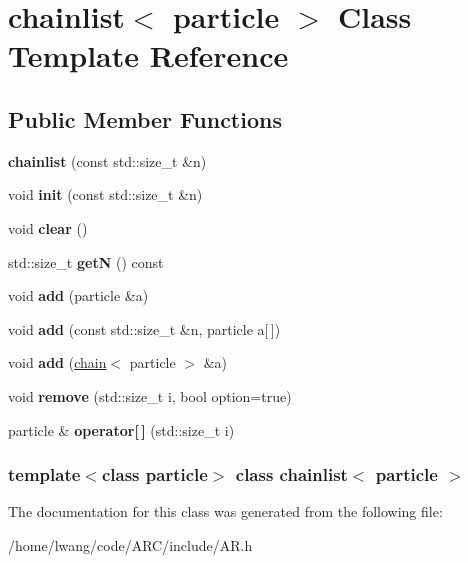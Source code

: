 \hypertarget{classchainlist}{
\section{chainlist$<$ particle $>$ Class Template Reference}
\label{classchainlist}
}
\subsection*{Public Member Functions}
\begin{DoxyCompactItemize}
\item 
\hypertarget{classchainlist_a633cf4dc2e6d45fcc5a7e304a82dfb9d}{
{\bfseries chainlist} (const std::size\_\-t \&n)}
\label{classchainlist_a633cf4dc2e6d45fcc5a7e304a82dfb9d}

\item 
\hypertarget{classchainlist_aa09d31dba5afa80c06b63292df2585f0}{
void {\bfseries init} (const std::size\_\-t \&n)}
\label{classchainlist_aa09d31dba5afa80c06b63292df2585f0}

\item 
\hypertarget{classchainlist_ab3e3716be84c058ad25637602f1712e0}{
void {\bfseries clear} ()}
\label{classchainlist_ab3e3716be84c058ad25637602f1712e0}

\item 
\hypertarget{classchainlist_a60969fad2dc9f9546eb4167e1cc17511}{
std::size\_\-t {\bfseries getN} () const }
\label{classchainlist_a60969fad2dc9f9546eb4167e1cc17511}

\item 
\hypertarget{classchainlist_a0d56fff164cdb326e41e5f4bfd69cfa7}{
void {\bfseries add} (particle \&a)}
\label{classchainlist_a0d56fff164cdb326e41e5f4bfd69cfa7}

\item 
\hypertarget{classchainlist_a0f1c047208cfcb84350c638289e37f66}{
void {\bfseries add} (const std::size\_\-t \&n, particle a\mbox{[}$\,$\mbox{]})}
\label{classchainlist_a0f1c047208cfcb84350c638289e37f66}

\item 
\hypertarget{classchainlist_a7ef6693832504d519150bf5afff71310}{
void {\bfseries add} (\hyperlink{classchain}{chain}$<$ particle $>$ \&a)}
\label{classchainlist_a7ef6693832504d519150bf5afff71310}

\item 
\hypertarget{classchainlist_aa7cf9be176ccb2534a936be5e7305650}{
void {\bfseries remove} (std::size\_\-t i, bool option=true)}
\label{classchainlist_aa7cf9be176ccb2534a936be5e7305650}

\item 
\hypertarget{classchainlist_a2d266cf975e973d8251c531529c0bca0}{
particle \& {\bfseries operator\mbox{[}$\,$\mbox{]}} (std::size\_\-t i)}
\label{classchainlist_a2d266cf975e973d8251c531529c0bca0}

\end{DoxyCompactItemize}
\subsubsection*{template$<$class particle$>$ class chainlist$<$ particle $>$}



The documentation for this class was generated from the following file:\begin{DoxyCompactItemize}
\item 
/home/lwang/code/ARC/include/AR.h\end{DoxyCompactItemize}
